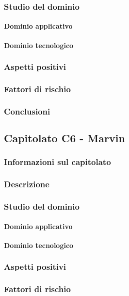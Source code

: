 	\subsubsection{Studio del dominio}
		\paragraph{Dominio applicativo}
		\paragraph{Dominio tecnologico}
	\subsubsection{Aspetti positivi}
	\subsubsection{Fattori di rischio}
	\subsubsection{Conclusioni}
	
		\subsection{Capitolato C6 - Marvin}
	\subsubsection{Informazioni sul capitolato}
	\subsubsection{Descrizione}
	\subsubsection{Studio del dominio}
		\paragraph{Dominio applicativo}
		\paragraph{Dominio tecnologico}
	\subsubsection{Aspetti positivi}
	\subsubsection{Fattori di rischio}
